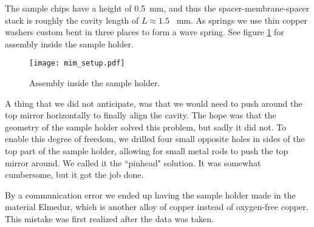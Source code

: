 The sample chips have a height of \SI{0.5}{\milli\meter}, and thus the spacer-membrane-spacer stack is roughly the cavity length of $L \approx 1.5$ \SI{}{\milli\meter}. As springs we use thin copper washers custom bent in three places to form a wave spring. See figure \ref{fig:sample_holder_inside} for assembly inside the sample holder.

\begin{figure}[H]
\centering
\texttt{[image: mim\_setup.pdf]}
\caption{Assembly inside the sample holder.}
\label{fig:sample_holder_inside}
\end{figure}

A thing that we did not anticipate, was that we would need to push around the top mirror horizontally to finally align the cavity. The hope was that the geometry of the sample holder solved this problem, but sadly it did not. To enable this degree of freedom, we drilled four small opposite holes in sides of the top part of the sample holder, allowing for small metal rods to push the top mirror around. We called it the ``pinhead" solution. It was somewhat cumbersome, but it got the job done.

By a communication error we ended up having the sample holder made in the material Elmedur, which is another alloy of copper instead of oxygen-free copper. This mistake was first realized after the data was taken.